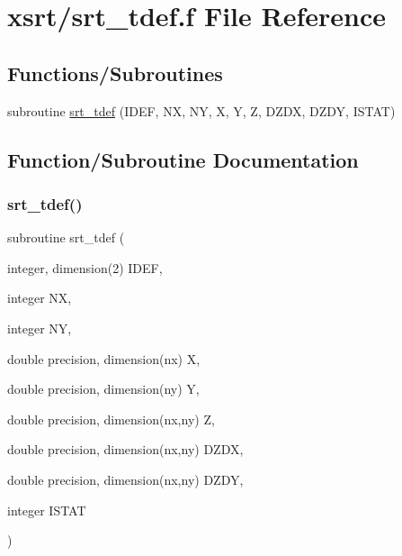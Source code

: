 \hypertarget{srt__tdef_8f}{}\section{xsrt/srt\+\_\+tdef.f File Reference}
\label{srt__tdef_8f}
\subsection*{Functions/\+Subroutines}
\begin{DoxyCompactItemize}
\item 
subroutine \hyperlink{srt__tdef_8f_a930aeab575daf0120e99e5bd5a735967}{srt\+\_\+tdef} (I\+D\+EF, NX, NY, X, Y, Z, D\+Z\+DX, D\+Z\+DY, I\+S\+T\+AT)
\end{DoxyCompactItemize}


\subsection{Function/\+Subroutine Documentation}
\mbox{\label{srt__tdef_8f_a930aeab575daf0120e99e5bd5a735967}} 
\subsubsection{\texorpdfstring{srt\+\_\+tdef()}{srt\_tdef()}}
{\footnotesize\ttfamily subroutine srt\+\_\+tdef (\begin{DoxyParamCaption}\item[{integer, dimension(2)}]{I\+D\+EF,  }\item[{integer}]{NX,  }\item[{integer}]{NY,  }\item[{double precision, dimension(nx)}]{X,  }\item[{double precision, dimension(ny)}]{Y,  }\item[{double precision, dimension(nx,ny)}]{Z,  }\item[{double precision, dimension(nx,ny)}]{D\+Z\+DX,  }\item[{double precision, dimension(nx,ny)}]{D\+Z\+DY,  }\item[{integer}]{I\+S\+T\+AT }\end{DoxyParamCaption})}

